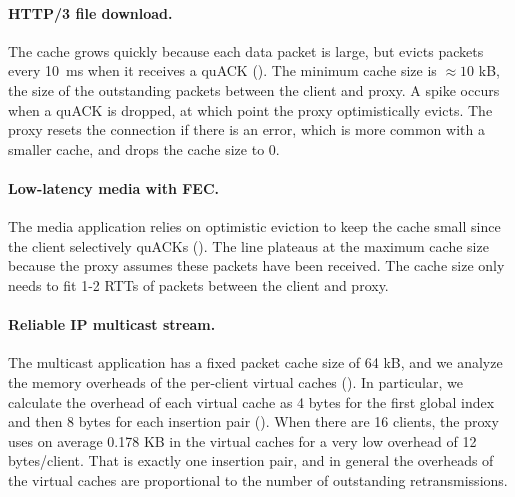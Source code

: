 \paragraph{HTTP/3 file download.}

The cache grows quickly because each data packet is large, but evicts
packets every 10~ms when
it receives a quACK (). The minimum cache size is
$\approx\!10$ kB, the size of the outstanding packets between the client and
proxy. A spike occurs when a quACK is dropped, at which point the proxy
optimistically evicts. The proxy resets the connection if there is an
error, which is more common with a smaller cache, and drops the cache
size to 0.

\paragraph{Low-latency media with FEC.}

The media application relies on optimistic eviction to keep the cache small
since the client selectively quACKs (). The
line plateaus at the maximum cache size because the proxy
assumes these packets have been received. The cache size only needs to fit 1-2
RTTs of packets between the client and proxy.

\paragraph{Reliable IP multicast stream.}

The multicast application has a fixed packet cache size of 64 kB, and we analyze
the memory overheads of the per-client virtual caches ().
In particular, we calculate the overhead of each virtual cache as 4 bytes for
the first global index and then 8 bytes for each insertion pair
(). When there are 16 clients, the proxy
uses on average 0.178 KB in the virtual caches for a very low overhead of 12
bytes/client. That is exactly one insertion pair, and in general the overheads
of the virtual caches are proportional to the number of outstanding
retransmissions.
